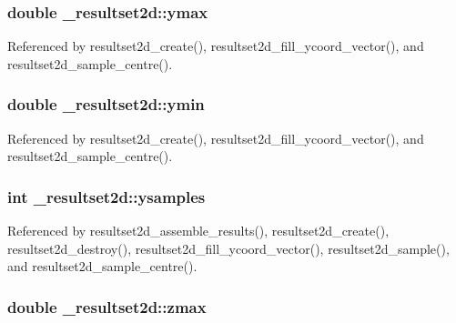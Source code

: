 \subsubsection[{\texorpdfstring{ymax}{ymax}}]{\setlength{\rightskip}{0pt plus 5cm}double \+\_\+resultset2d\+::ymax}\hypertarget{struct__resultset2d_ae24d2c2d285e258f8278e14da77944b6}{}\label{struct__resultset2d_ae24d2c2d285e258f8278e14da77944b6}


Referenced by resultset2d\+\_\+create(), resultset2d\+\_\+fill\+\_\+ycoord\+\_\+vector(), and resultset2d\+\_\+sample\+\_\+centre().

\subsubsection[{\texorpdfstring{ymin}{ymin}}]{\setlength{\rightskip}{0pt plus 5cm}double \+\_\+resultset2d\+::ymin}\hypertarget{struct__resultset2d_ab7acf7a5152f560c9f773992699b36d4}{}\label{struct__resultset2d_ab7acf7a5152f560c9f773992699b36d4}


Referenced by resultset2d\+\_\+create(), resultset2d\+\_\+fill\+\_\+ycoord\+\_\+vector(), and resultset2d\+\_\+sample\+\_\+centre().

\subsubsection[{\texorpdfstring{ysamples}{ysamples}}]{\setlength{\rightskip}{0pt plus 5cm}int \+\_\+resultset2d\+::ysamples}\hypertarget{struct__resultset2d_af402c640abad43978a89986c338bfc66}{}\label{struct__resultset2d_af402c640abad43978a89986c338bfc66}


Referenced by resultset2d\+\_\+assemble\+\_\+results(), resultset2d\+\_\+create(), resultset2d\+\_\+destroy(), resultset2d\+\_\+fill\+\_\+ycoord\+\_\+vector(), resultset2d\+\_\+sample(), and resultset2d\+\_\+sample\+\_\+centre().

\subsubsection[{\texorpdfstring{zmax}{zmax}}]{\setlength{\rightskip}{0pt plus 5cm}double \+\_\+resultset2d\+::zmax}\hypertarget{struct__resultset2d_a518fa09d7885eede64e76b76f81cbd4a}{}\label{struct__resultset2d_a518fa09d7885eede64e76b76f81cbd4a}


